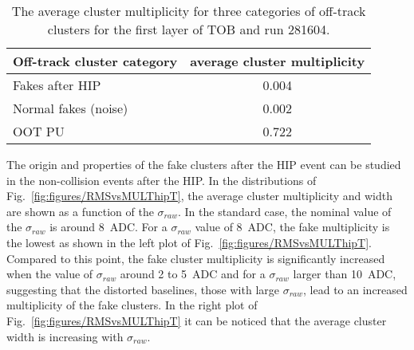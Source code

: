 \begin{table}[h]
\begin{center}
\begin{tabular}{|l|c|}
\hline
Off-track cluster category & average cluster multiplicity \\
\hline
Fakes after HIP & 0.004  \\
Normal fakes (noise) & 0.002  \\
OOT PU & 0.722 \\
\hline
\end{tabular}
\caption[Table caption text]{The average cluster multiplicity for three categories of off-track clusters for the first layer of TOB and run 281604. }
\label{tab:multFake}
\end{center}
\end{table}




The origin and properties of the fake clusters after the HIP event can be studied in the non-collision events after the HIP. In the distributions of Fig.~\ref{fig:figures/RMSvsMULThipT}, the average cluster multiplicity and width are shown as a function of the $\sigma_{raw}$. In the standard case, the nominal value of the $\sigma_{raw}$ is around 8~ADC. For a  $\sigma_{raw}$ value of 8~ADC, the fake multiplicity is the lowest as shown in the left plot of Fig.~\ref{fig:figures/RMSvsMULThipT}. Compared to this point, the fake cluster multiplicity is significantly increased when the value of $\sigma_{raw}$  around 2 to 5~ADC and for a $\sigma_{raw}$ larger than 10~ADC, suggesting that the distorted baselines, those with large $\sigma_{raw}$, lead to an increased multiplicity of the fake clusters. In the right plot of Fig.~\ref{fig:figures/RMSvsMULThipT} it can be noticed that the average cluster width is increasing with $\sigma_{raw}$. 

